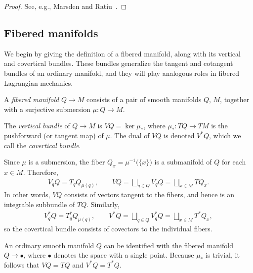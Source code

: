 \documentclass[pdftex]{sigma}
\numberwithin{equation}{section}
\begin{document}
\begin{proof}
 See, e.g., Marsden and Ratiu~\cite[Theorem~8.1.3]{MaRa1999}.
\end{proof}

\subsection{Fibered manifolds}\label{sec:fibered}

We begin by giving the def\/inition of a f\/ibered manifold, along with its vertical and covertical bundles. These bundles generalize the tangent and cotangent bundles of an ordinary manifold, and they will play analogous roles in f\/ibered Lagrangian mechanics.

\begin{Definition}
A \emph{fibered manifold} $ Q \rightarrow M $ consists of a pair of smooth manifolds $ Q $, $M$, together with a surjective submersion $ \mu \colon Q \rightarrow M $.
\end{Definition}

\begin{Definition}
The \emph{vertical bundle} of $ Q \rightarrow M $ is $ V Q = \ker \mu _\ast $, where $ \mu _\ast \colon T Q \rightarrow T M $ is the pushforward (or tangent map) of $\mu$. The dual of $ V Q $ is denoted $ V ^\ast Q $, which we call the \emph{covertical bundle}.
\end{Definition}

\begin{Remark} \label{rmk:disjoint}
Since $\mu$ is a submersion, the f\/iber $ Q _x = \mu ^{-1} \bigl( \{ x \} \bigr) $ is a submanifold of $Q$ for each $ x \in M $. Therefore,
 \begin{gather*}
 V _q Q = T _q Q _{\mu (q) } , \qquad V Q = \bigsqcup _{ q \in Q } V_q Q = \bigsqcup _{ x \in M } T Q _x .
 \end{gather*}
In other words, $ V Q $ consists of vectors tangent to the f\/ibers, and hence is an integrable subbundle of $ T Q $. Similarly,
\begin{gather*}
 V ^\ast_q Q = T ^\ast _q Q _{ \mu (q) } , \qquad V ^\ast Q = \bigsqcup _{ q \in Q } V _q ^\ast Q = \bigsqcup _{ x \in M } T ^\ast Q _x ,
 \end{gather*}
so the covertical bundle consists of covectors to the individual f\/ibers.
\end{Remark}

\begin{Example} An ordinary smooth manifold $Q$ can be identif\/ied with the f\/ibered manifold $ Q \rightarrow \bullet $, where $ \bullet $ denotes the space with a single point. Because $ \mu _\ast $ is trivial, it follows that $ V Q = T Q $ and $ V ^\ast Q = T ^\ast Q $.
\end{Example}
\end{document}
